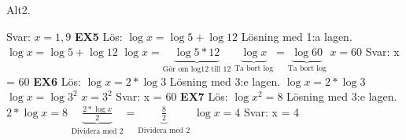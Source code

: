 \documentclass[a4paper,11pt]{article}
\begin{document}
\begin{flushleft}
Alt2.\newline

Svar: $ x = 1,9$
\newline\newline
\textbf{EX5}\newline
Lös: $\log{x} = \log{5}+\log{12}$\newline
Lösning med 1:a lagen.\newline\newline
$ \log{x} = \log{5}+\log{12} $\newline
$ \log{x} = \underbrace{\log{5*12}}_{\text{Gör om log12 till 12}} $ \newline\newline
$ \underbrace{\log{x}}_{\text{Ta bort log}} = \underbrace{\log{60}}_{\text{Ta bort log}}  $\newline\newline
$ x = 60$\newline
Svar: x = 60
\newline\newline
\textbf{EX6}\newline
Lös: $\log{x} = 2*\log{3}$\newline
Lösning med 3:e lagen. \newline\newline
$ \log{x} = 2*\log{3} $\newline
$ \log{x} = \log{3^2} $ \newline\newline
$ x = 3^2 $\newline\newline
Svar: x = 60
\newline\newline
\textbf{EX7}\newline
Lös: $\log{x^2} = 8$\newline
Lösning med 3:e lagen. \newline\newline
$ 2*\log{x} = 8 $\newline\newline
$ \underbrace{\frac{2*\log{x}}{2}}_{\text{Dividera med 2}} = \underbrace{\frac{8}{2}}_{\text{Dividera med 2}}  $ \newline\newline
$ \log{x} = 4 $\newline\newline
Svar: x = 4


\end{flushleft}
\end{document}
